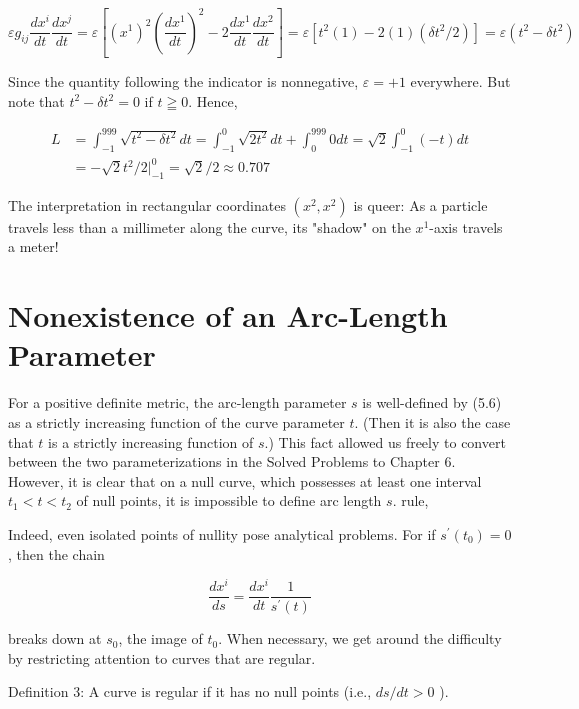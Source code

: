 \documentclass[10pt]{article}
\begin{document}
$$
\varepsilon g_{i j} \frac{d x^{i}}{d t} \frac{d x^{j}}{d t}=\varepsilon\left[\left(x^{1}\right)^{2}\left(\frac{d x^{1}}{d t}\right)^{2}-2 \frac{d x^{1}}{d t} \frac{d x^{2}}{d t}\right]=\varepsilon\left[t^{2}(1)-2(1)\left(\delta t^{2} / 2\right)\right]=\varepsilon\left(t^{2}-\delta t^{2}\right)
$$

Since the quantity following the indicator is nonnegative, $\varepsilon=+1$ everywhere. But note that $t^{2}-\delta t^{2}=0$ if $t \geqq 0$. Hence,

$$
\begin{aligned}
L & =\int_{-1}^{999} \sqrt{t^{2}-\delta t^{2}} d t=\int_{-1}^{0} \sqrt{2 t^{2}} d t+\int_{0}^{999} 0 d t=\sqrt{2} \int_{-1}^{0}(-t) d t \\
& =-\sqrt{2} t^{2} /\left.2\right|_{-1} ^{0}=\sqrt{2} / 2 \approx 0.707
\end{aligned}
$$

The interpretation in rectangular coordinates $\left(x^{2}, x^{2}\right)$ is queer: As a particle travels less than a millimeter along the curve, its "shadow" on the $x^{1}$-axis travels a meter!

\section*{Nonexistence of an Arc-Length Parameter}
For a positive definite metric, the arc-length parameter $s$ is well-defined by (5.6) as a strictly increasing function of the curve parameter $t$. (Then it is also the case that $t$ is a strictly increasing function of $s$.) This fact allowed us freely to convert between the two parameterizations in the Solved Problems to Chapter 6. However, it is clear that on a null curve, which possesses at least one interval $t_{1}<t<t_{2}$ of null points, it is impossible to define arc length $s$. rule,

Indeed, even isolated points of nullity pose analytical problems. For if $s^{\prime}\left(t_{0}\right)=0$, then the chain


\begin{equation*}
\frac{d x^{i}}{d s}=\frac{d x^{i}}{d t} \frac{1}{s^{\prime}(t)} \tag{7.3}
\end{equation*}


breaks down at $s_{0}$, the image of $t_{0}$. When necessary, we get around the difficulty by restricting attention to curves that are regular.

Definition 3: A curve is regular if it has no null points (i.e., $d s / d t>0$ ).
\end{document}
